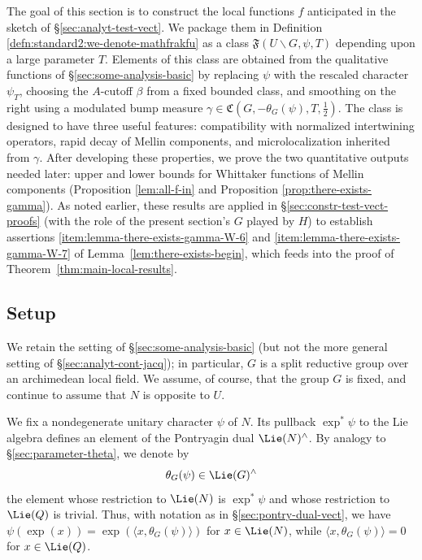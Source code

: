 The goal of this section is to construct the local functions $f$ anticipated in the sketch of \S\ref{sec:analyt-test-vect}.  We package them in Definition \ref{defn:standard2:we-denote-mathfrakfu} as a class $\mathfrak{F}(U \backslash G,\psi,T)$ depending upon a large parameter $T$.  Elements of this class are obtained from the qualitative functions of \S\ref{sec:some-analysis-basic} by replacing $\psi$ with the rescaled character $\psi_T$, choosing the $A$-cutoff $\beta$ from a fixed bounded class, and smoothing on the right using a modulated bump measure $\gamma \in \mathfrak{C}(G,-\theta_G(\psi),T,\tfrac{1}{2})$.  The class is designed to have three useful features: compatibility with normalized intertwining operators, rapid decay of Mellin components, and microlocalization inherited from $\gamma$.  After developing these properties, we prove the two quantitative outputs needed later: upper and lower bounds for Whittaker functions of Mellin components (Proposition \ref{lem:all-f-in} and Proposition \ref{prop:there-exists-gamma}).  As noted earlier, these results are applied in \S\ref{sec:constr-test-vect-proofs} (with the role of the present section's $G$ played by $H$) to establish assertions \eqref{item:lemma-there-exists-gamma-W-6} and \eqref{item:lemma-there-exists-gamma-W-7} of Lemma~\ref{lem:there-exists-begin}, which feeds into the proof of Theorem~\ref{thm:main-local-results}.

\subsection{Setup}\label{sec:analysis-U-G-quantitative-setup}
We retain the setting of \S\ref{sec:some-analysis-basic} (but not the more general setting of \S\ref{sec:analyt-cont-jacq}); in particular, $G$ is a split reductive group over an archimedean local field.  We assume, of course, that the group $G$ is fixed, and continue to assume that $N$ is opposite to $U$.

We fix a nondegenerate unitary character $\psi$ of $N$.  Its pullback $\exp^* \psi$ to the Lie algebra defines an element of the Pontryagin dual $\Lie(N)^\wedge$.  By analogy to \S\ref{sec:parameter-theta}, we denote by
\begin{equation*}
  \theta_G(\psi) \in \Lie(G)^\wedge
\end{equation*}
the element whose restriction to $\Lie(N)$ is $\exp^*\psi$ and whose restriction to $\Lie(Q)$ is trivial.  Thus, with notation as in \S\ref{sec:pontry-dual-vect}, we have $\psi(\exp(x)) = \exp (\langle x, \theta_G(\psi)  \rangle)$ for $x \in \Lie(N)$, while $\langle x, \theta_G(\psi) \rangle = 0$ for $x \in \Lie(Q)$.

